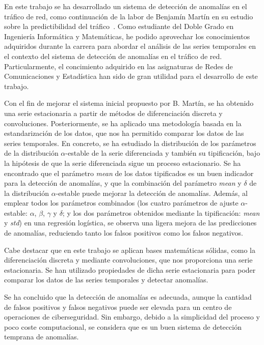 En este trabajo se ha desarrollado un sistema de detección de anomalías en el tráfico de red, como continuación de la labor de Benjamín Martín en su estudio sobre la predictibilidad del tráfico~\cite{benjamin2023}. Como estudiante del Doble Grado en Ingeniería Informática y Matemáticas, he podido aprovechar los conocimientos adquiridos durante la carrera para abordar el análisis de las series temporales en el contexto del sistema de detección de anomalías en el tráfico de red. Particularmente, el concimiento adquirido en las asignaturas de Redes de Comunicaciones y Estadística han sido de gran utilidad para el desarrollo de este trabajo.

Con el fin de mejorar el sistema inicial propuesto por B. Martín, se ha obtenido una serie estacionaria a partir de métodos de diferenciación discreta y convoluciones.
Posteriormente, se ha aplicado una metodología basada en la estandarización de los datos, que nos ha permitido comparar los datos de las series temporales. En concreto, se ha estudiado la distribución de los parámetros de la distribución $\alpha$-estable de la serie diferenciada y también su tipificación, bajo la hipótesis de que la serie diferenciada sigue un proceso estacionario. Se ha encontrado que el parámetro \textit{mean} de los datos tipificados es un buen indicador para la detección de anomalías, y que la combinación del parámetro \textit{mean} y $\delta$ de la distribución $\alpha$-estable puede mejorar la detección de anomalías. Además, al emplear todos los parámetros combinados (los cuatro parámetros de ajuste $\alpha$-estable: $\alpha$, $\beta$, $\gamma$ y $\delta$; y los dos parámetros obtenidos mediante la tipificación: \textit{mean} y \textit{std}) en una regresión logística, se observa una ligera mejora de las predicciones de anomalías, reduciendo tanto los falsos positivos como los falsos negativos.

Cabe destacar que en este trabajo se aplican bases matemáticas sólidas, como la diferenciación discreta y mediante convoluciones, que nos proporciona una serie estacionaria. Se han utilizado propiedades de dicha serie estacionaria para poder comparar los datos de las series temporales y detectar anomalías.

Se ha concluido que la detección de anomalías es adecuada, aunque la cantidad de falsos positivos y falsos negativos puede ser elevada para un centro de operaciones de ciberseguridad. Sin embargo, debido a la simplicidad del proceso y poco coste computacional, se considera que es un buen sistema de detección temprana de anomalías.